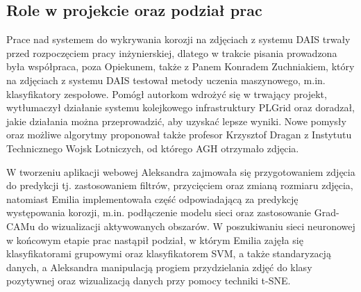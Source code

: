 \documentclass[polish,12pt]{aghthesis}
\begin{document}
\subsection{Role w projekcie oraz podział prac}
Prace nad systemem do wykrywania korozji na zdjęciach z systemu DAIS trwały przed rozpoczęciem pracy inżynierskiej, dlatego w trakcie pisania prowadzona była współpraca, poza Opiekunem, także z Panem Konradem Zuchniakiem, który na zdjęciach z systemu DAIS testował metody uczenia maszynowego, m.in. klasyfikatory zespołowe. Pomógł autorkom wdrożyć się w trwający projekt, wytłumaczył działanie systemu kolejkowego infrastruktury PLGrid oraz doradzał, jakie działania można przeprowadzić, aby uzyskać lepsze wyniki. Nowe pomysły oraz możliwe algorytmy proponował także profesor Krzysztof Dragan z Instytutu Technicznego Wojsk Lotniczych, od którego AGH otrzymało zdjęcia.
\par
W tworzeniu aplikacji webowej Aleksandra zajmowała się przygotowaniem zdjęcia do predykcji tj. zastosowaniem filtrów, przycięciem oraz zmianą rozmiaru zdjęcia, natomiast Emilia implementowała część odpowiadającą za predykcję występowania korozji, m.in. podłączenie modelu sieci oraz zastosowanie Grad-CAMu do wizualizacji aktywowanych obszarów. W poszukiwaniu sieci neuronowej w końcowym etapie prac nastąpił podział, w którym Emilia zajęła się klasyfikatorami grupowymi oraz klasyfikatorem SVM, a także standaryzacją danych, a Aleksandra manipulacją progiem przydzielania zdjęć do klasy pozytywnej oraz wizualizacją danych przy pomocy techniki t-SNE.
\end{document}
